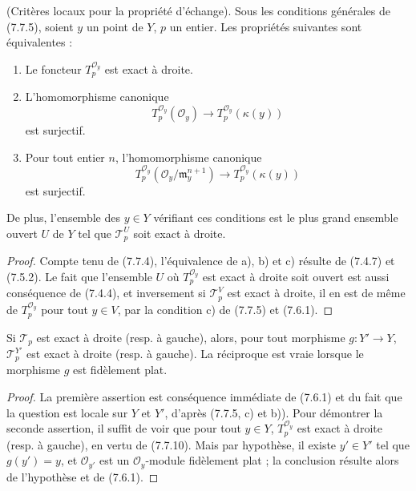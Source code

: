 \begin{proposition}[7.7.10]
\textnormal{(Critères locaux pour la propriété d'échange).} Sous les conditions
générales de (7.7.5), soient $y$ un point de $Y$, $p$ un entier. Les propriétés
suivantes sont équivalentes :
\begin{enumerate}
  \item[a)] Le foncteur $T_p^{\mathscr O_y}$ est exact à droite.

  \item[b)] L'homomorphisme canonique
    \[
      T_p^{\mathscr O_y}(\mathscr O_y)
      \longrightarrow
      T_p^{\mathscr O_y}(\kappa(y))
    \]
    est surjectif.

  \item[c)] Pour tout entier $n$, l'homomorphisme canonique
    \[
      T_p^{\mathscr O_y}
      (\mathscr O_y/\mathfrak m_y^{n+1})
      \longrightarrow
      T_p^{\mathscr O_y}(\kappa(y))
    \]
    est surjectif.
\end{enumerate}
De plus, l'ensemble des $y\in Y$ vérifiant ces conditions est le plus grand
ensemble ouvert $U$ de $Y$ tel que $\mathscr T_p^U$ soit exact à droite.
\end{proposition}

\begin{proof}
Compte tenu de (7.7.4), l'équivalence de a), b) et c) résulte de (7.4.7) et
(7.5.2). Le fait que l'ensemble $U$ où $T_p^{\mathscr O_y}$ est exact à droite
soit ouvert est aussi conséquence de (7.4.4), et inversement si
$\mathscr T_p^V$ est exact à droite, il en est de même de
$T_p^{\mathscr O_y}$ pour tout $y\in V$, par la condition c) de (7.7.5) et
(7.6.1).
\end{proof}

\begin{corollary}[7.7.11]
Si $\mathscr T_p$ est exact à droite (resp. à gauche), alors, pour tout morphisme
$g:Y'\to Y$, $\mathscr T_p^{Y'}$ est exact à droite (resp. à gauche). La
réciproque est vraie lorsque le morphisme $g$ est fidèlement plat.
\end{corollary}

\begin{proof}
La première assertion est conséquence immédiate de (7.6.1) et du fait que la
question est locale sur $Y$ et $Y'$, d'après (7.7.5, c) et b)). Pour démontrer
la seconde assertion, il suffit de voir que pour tout $y\in Y$,
$T_p^{\mathscr O_y}$ est exact à droite (resp. à gauche), en vertu de (7.7.10).
Mais par hypothèse, il existe $y'\in Y'$ tel que $g(y')=y$, et
$\mathscr O_{y'}$ est un $\mathscr O_y$-module fidèlement plat ; la conclusion
résulte alors de l'hypothèse et de (7.6.1).
\end{proof}

